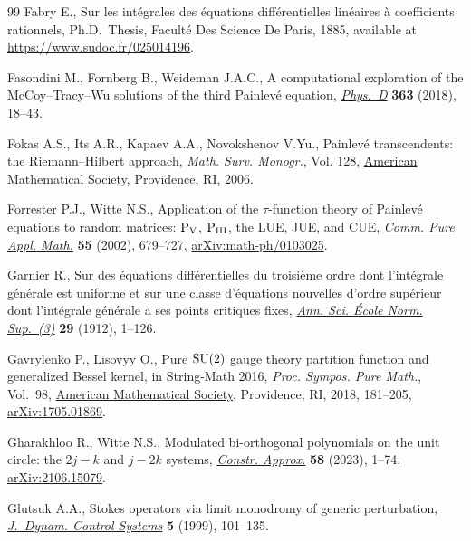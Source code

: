 \documentclass[pdftex]{sigma}
\numberwithin{equation}{section}
\begin{document}
\begin{thebibliography}{99}
Fabry E., Sur les int\'egrales des \'equations diff\'erentielles lin\'eaires
 \`a coefficients rationnels, Ph.D.~Thesis, {F}acult\'e Des Science De Paris,
 1885, available at \url{https://www.sudoc.fr/025014196}.

Fasondini M., Fornberg B., Weideman J.A.C., A computational exploration of the
 {M}c{C}oy--{T}racy--{W}u solutions of the third {P}ainlev\'e equation,
 \href{https://doi.org/10.1016/j.physd.2017.10.011}{\textit{Phys.~D}} \textbf{363} (2018), 18--43.

Fokas A.S., Its A.R., Kapaev A.A., Novokshenov V.Yu., Painlev\'e transcendents:
 the {R}iemann--{H}ilbert approach, \textit{Math. Surv. Monogr.}, Vol. 128,
 \href{https://doi.org/10.1090/surv/128}{American Mathematical Society}, Providence, RI, 2006.

Forrester P.J., Witte N.S., Application of the {$\tau$}-function theory of
 {P}ainlev\'e equations to random matrices: {$\rm P_V$}, {$\rm P_{III}$}, the
 {LUE}, {JUE}, and {CUE}, \href{https://doi.org/10.1002/cpa.3021}{\textit{Comm. Pure Appl. Math.}} \textbf{55} (2002),
 679--727, \href{https://arxiv.org/abs/math-ph/0103025}{arXiv:math-ph/0103025}.

Garnier R., Sur des \'equations diff\'erentielles du troisi\`eme ordre dont
 l'int\'egrale g\'en\'erale est uniforme et sur une classe d'\'equations
 nouvelles d'ordre sup\'erieur dont l'int\'egrale g\'en\'erale a ses points
 critiques fixes, \href{https://doi.org/10.24033/asens.644}{\textit{Ann. Sci. \'{E}cole Norm. Sup.~(3)}} \textbf{29}
 (1912), 1--126.

Gavrylenko P., Lisovyy O., Pure {${\rm SU}(2)$} gauge theory partition function
 and generalized {B}essel kernel, in String-{M}ath 2016, \textit{Proc. Sympos.
 Pure Math.}, Vol.~98, \href{https://doi.org/10.1090/pspum/098/07}{American Mathematical Society}, Providence, RI, 2018,
 181--205, \href{https://arxiv.org/abs/1705.01869}{arXiv:1705.01869}.

Gharakhloo R., Witte N.S., Modulated bi-orthogonal polynomials on the unit
 circle: the {$2j-k$} and {$j-2k$} systems, \href{https://doi.org/10.1007/s00365-022-09604-2}{\textit{Constr. Approx.}}
 \textbf{58} (2023), 1--74, \href{https://arxiv.org/abs/2106.15079}{arXiv:2106.15079}.

Glutsuk A.A., Stokes operators via limit monodromy of generic perturbation,
 \href{https://doi.org/10.1023/A:1021744801409}{\textit{J.~Dynam. Control Systems}} \textbf{5} (1999), 101--135.


\end{thebibliography}
\end{document}
